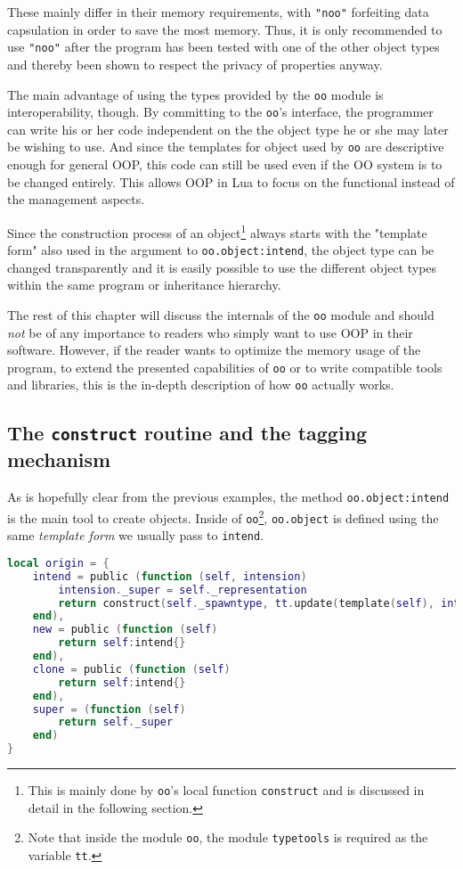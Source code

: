 These mainly differ in their memory requirements, with \texttt{"noo"} forfeiting data capsulation in order to save the most memory. Thus, it is only recommended to use \texttt{"noo"} after the program has been tested with one of the other object types and thereby been shown to respect the privacy of properties anyway.

The main advantage of using the types provided by the \texttt{oo} module is interoperability, though. By committing to the \texttt{oo}'s interface, the programmer can write his or her code independent on the the object type he or she may later be wishing to use. And since the templates for object used by \texttt{oo} are descriptive enough for general OOP, this code can still be used even if the OO system is to be changed entirely. This allows OOP in Lua to focus on the functional instead of the management aspects.

Since the construction process of an object\footnote{This is mainly done by \texttt{oo}'s local function \texttt{construct} and is discussed in detail in the following section.} always starts with the "template form" also used in the argument to \texttt{oo.object:intend}, the object type can be changed transparently and it is easily possible to use the different object types within the same program or inheritance hierarchy.

The rest of this chapter will discuss the internals of the \texttt{oo} module and should \emph{not} be of any importance to readers who simply want to use OOP in their software. However, if the reader wants to optimize the memory usage of the program, to extend the presented capabilities of \texttt{oo} or to write compatible tools and libraries, this is the in-depth description of how \texttt{oo} actually works.

\subsection{The \texttt{construct} routine and the tagging mechanism}
\label{sec:oo:tags}

As is hopefully clear from the previous examples, the method \texttt{oo.object:intend} is the main tool to create objects. Inside of \texttt{oo}\footnote{Note that inside the module \texttt{oo}, the module \texttt{typetools} is required as the variable \texttt{tt}.}, \texttt{oo.object} is defined using the same \emph{template form} we usually pass to \texttt{intend}.

\begin{lstlisting}[language=lua, caption={The definition of the methods of \texttt{oo.object} from \texttt{"oo.lua"}}, label=lst:origin, name=lst:origin]
local origin = {
    intend = public (function (self, intension)
        intension._super = self._representation
        return construct(self._spawntype, tt.update(template(self), intension))
    end),
    new = public (function (self)
        return self:intend{}
    end),
    clone = public (function (self)
        return self:intend{}
    end),
    super = (function (self)
        return self._super
    end)
}
\end{lstlisting}

